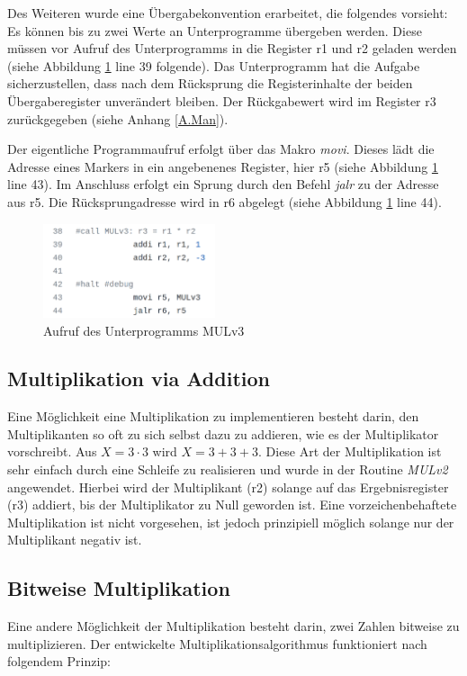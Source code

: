 \documentclass[fleqn, a4paper, 11pt]{article}       %
\begin{document}
Des Weiteren wurde eine Übergabekonvention erarbeitet, die folgendes vorsieht: Es können bis zu zwei Werte an Unterprogramme übergeben werden. Diese müssen vor Aufruf des Unterprogramms in die Register r1 und r2 geladen werden (siehe Abbildung \ref{fig:FKT} line 39 folgende). Das Unterprogramm hat die Aufgabe sicherzustellen, dass nach dem Rücksprung die Registerinhalte der beiden Übergaberegister unverändert bleiben. Der Rückgabewert wird im Register r3 zurückgegeben (siehe Anhang \ref{A.Man}).

Der eigentliche Programmaufruf erfolgt über das Makro \emph{movi}. Dieses lädt die Adresse eines Markers in ein angebenenes Register, hier r5 (siehe Abbildung \ref{fig:FKT} line 43). Im Anschluss erfolgt ein Sprung durch den Befehl \emph{jalr} zu der Adresse aus r5. Die Rücksprungadresse wird in r6 abgelegt (siehe Abbildung \ref{fig:FKT} line 44).

\begin{figure}[h]
    \includegraphics[width =0.45\textwidth]{Funktionsaufruf.png}
\caption{Aufruf des Unterprogramms MULv3}
\label{fig:FKT}
\end{figure}


\subsection{Multiplikation via Addition}
Eine Möglichkeit eine Multiplikation zu implementieren besteht darin, den Multiplikanten so oft zu sich selbst dazu zu addieren, wie es der Multiplikator vorschreibt. Aus $X = 3 \cdot 3$ wird  $X = 3+3+3$. Diese Art der Multiplikation ist sehr einfach durch eine Schleife zu realisieren und wurde in der Routine \emph{MULv2} angewendet. Hierbei wird der Multiplikant (r2) solange auf das Ergebnisregister (r3) addiert, bis der Multiplikator zu Null geworden ist. Eine vorzeichenbehaftete Multiplikation ist nicht vorgesehen, ist jedoch prinzipiell möglich solange nur der Multiplikant negativ ist. 

\subsection{Bitweise Multiplikation}
Eine andere Möglichkeit der Multiplikation besteht darin, zwei Zahlen bitweise zu multiplizieren. Der entwickelte Multiplikationsalgorithmus funktioniert nach folgendem Prinzip: 
\end{document}
